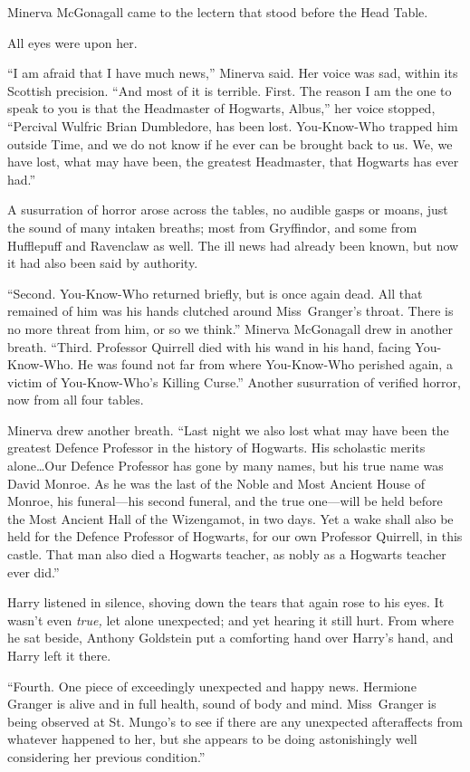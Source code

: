 Minerva McGonagall came to the lectern that stood before the Head Table.

All eyes were upon her.

“I am afraid that I have much news,” Minerva said. Her voice was sad, within
its Scottish precision. “And most of it is terrible. First. The reason I am the
one to speak to you is that the Headmaster of Hogwarts, Albus,” her voice
stopped, “Percival Wulfric Brian Dumbledore, has been lost. You-Know-Who
trapped him outside Time, and we do not know if he ever can be brought back to
us. We, we have lost, what may have been, the greatest Headmaster, that
Hogwarts has ever had.”

A susurration of horror arose across the tables, no audible gasps or moans,
just the sound of many intaken breaths; most from Gryffindor, and some from
Hufflepuff and Ravenclaw as well. The ill news had already been known, but now
it had also been said by authority.

“Second. You-Know-Who returned briefly, but is once again dead. All that
remained of him was his hands clutched around Miss~Granger’s throat. There is
no more threat from him, or so we think.” Minerva McGonagall drew in another
breath. “Third. Professor Quirrell died with his wand in his hand, facing
You-Know-Who. He was found not far from where You-Know-Who perished again, a
victim of You-Know-Who’s Killing Curse.” Another susurration of verified
horror, now from all four tables.

Minerva drew another breath. “Last night we also lost what may have been the
greatest Defence Professor in the history of Hogwarts. His scholastic merits
alone…Our Defence Professor has gone by many names, but his true name
was David Monroe. As he was the last of the Noble and Most Ancient House of
Monroe, his funeral—his second funeral, and the true one—will be held
before the Most Ancient Hall of the Wizengamot, in two days. Yet a wake shall
also be held for the Defence Professor of Hogwarts, for our own Professor
Quirrell, in this castle. That man also died a Hogwarts teacher, as nobly as a
Hogwarts teacher ever did.”

Harry listened in silence, shoving down the tears that again rose to his eyes.
It wasn’t even \emph{true,} let alone unexpected; and yet hearing it still
hurt. From where he sat beside, Anthony Goldstein put a comforting hand over
Harry’s hand, and Harry left it there.

“Fourth. One piece of exceedingly unexpected and happy news. Hermione Granger
is alive and in full health, sound of body and mind. Miss~Granger is being
observed at St. Mungo’s to see if there are any unexpected afteraffects from
whatever happened to her, but she appears to be doing astonishingly well
considering her previous condition.”

